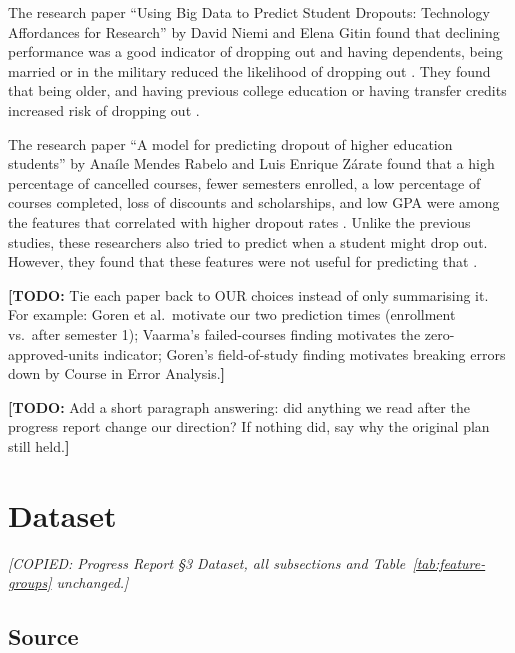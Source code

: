 \documentclass[11pt]{article}
\newcommand{\todo}[1]{{\color{red}\textbf{[TODO:} #1\textbf{]}}}
\newcommand{\copynote}[1]{{\color{blue}\textit{[COPIED: #1]}}}
\newcommand{\todo}[1]{}
\newcommand{\copynote}[1]{}
\begin{document}
The research paper ``Using Big Data to Predict Student Dropouts: Technology Affordances for Research'' by David Niemi and Elena Gitin found that declining performance was a good indicator of dropping out and having dependents, being married or in the military reduced the likelihood of dropping out \citep{niemi2012}. They found that being older, and having previous college education or having transfer credits increased risk of dropping out \citep{niemi2012}.

The research paper ``A model for predicting dropout of higher education students'' by Anaíle Mendes Rabelo and Luis Enrique Zárate found that a high percentage of cancelled courses, fewer semesters enrolled, a low percentage of courses completed, loss of discounts and scholarships, and low GPA were among the features that correlated with higher dropout rates \citep{rabelo2025}. Unlike the previous studies, these researchers also tried to predict when a student might drop out. However, they found that these features were not useful for predicting that \citep{rabelo2025}.

\todo{Tie each paper back to OUR choices instead of only summarising it. For example: Goren et al.\ motivate our two prediction times (enrollment vs.\ after semester 1); Vaarma's failed-courses finding motivates the zero-approved-units indicator; Goren's field-of-study finding motivates breaking errors down by Course in Error Analysis.}

\todo{Add a short paragraph answering: did anything we read after the progress report change our direction? If nothing did, say why the original plan still held.}

\section{Dataset}\label{sec:dataset}
\copynote{Progress Report \S3 Dataset, all subsections and Table~\ref{tab:feature-groups} unchanged.}

\subsection{Source}
\end{document}
